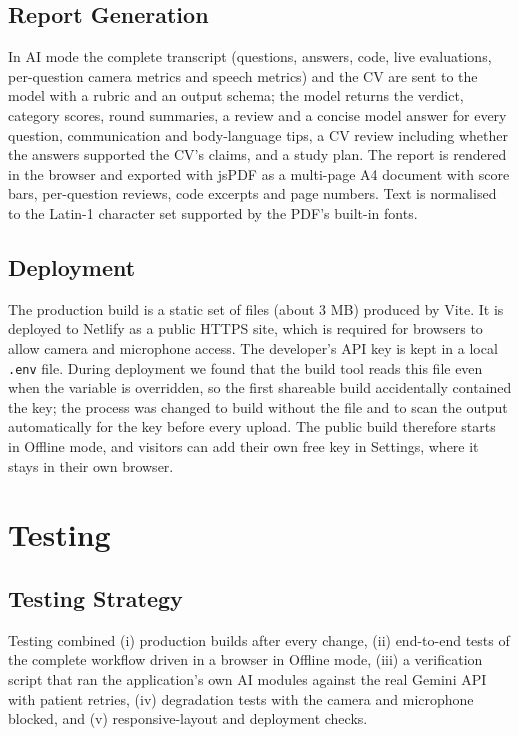 \documentclass[12pt,a4paper,oneside]{report}
\begin{document}
\section{Report Generation}
In AI mode the complete transcript (questions, answers, code, live evaluations, per-question camera metrics and speech metrics) and the CV are sent to the model with a rubric and an output schema; the model returns the verdict, category scores, round summaries, a review and a concise model answer for every question, communication and body-language tips, a CV review including whether the answers supported the CV's claims, and a study plan. The report is rendered in the browser and exported with jsPDF as a multi-page A4 document with score bars, per-question reviews, code excerpts and page numbers. Text is normalised to the Latin-1 character set supported by the PDF's built-in fonts.

\section{Deployment}
The production build is a static set of files (about 3 MB) produced by Vite. It is deployed to Netlify as a public HTTPS site, which is required for browsers to allow camera and microphone access. The developer's API key is kept in a local \texttt{.env} file. During deployment we found that the build tool reads this file even when the variable is overridden, so the first shareable build accidentally contained the key; the process was changed to build without the file and to scan the output automatically for the key before every upload. The public build therefore starts in Offline mode, and visitors can add their own free key in Settings, where it stays in their own browser.

\chapter{Testing}\label{ch:test}

\section{Testing Strategy}
Testing combined (i) production builds after every change, (ii) end-to-end tests of the complete workflow driven in a browser in Offline mode, (iii) a verification script that ran the application's own AI modules against the real Gemini API with patient retries, (iv) degradation tests with the camera and microphone blocked, and (v) responsive-layout and deployment checks.
\end{document}
